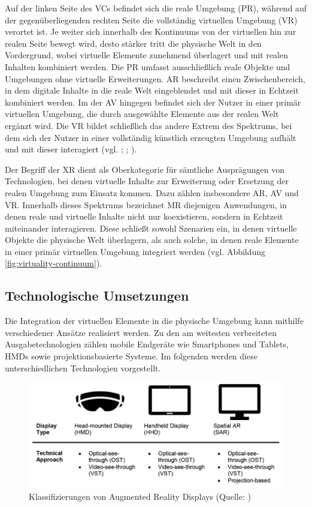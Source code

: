 Auf der linken Seite des \ac{VC}s befindet sich die reale Umgebung (\ac{PR}), während auf der gegenüberliegenden rechten Seite die vollständig virtuellen Umgebung (\ac{VR}) verortet ist. Je weiter sich innerhalb des Kontinuums von der virtuellen hin zur realen Seite bewegt wird, desto stärker tritt die physische Welt in den Vordergrund, wobei virtuelle Elemente zunehmend überlagert und mit realen Inhalten kombiniert werden. 
Die \ac{PR} umfasst ausschließlich reale Objekte und Umgebungen ohne virtuelle Erweiterungen. \ac{AR} beschreibt einen Zwischenbereich, in dem digitale Inhalte in die reale Welt eingeblendet und mit dieser in Echtzeit kombiniert werden. Im der \ac{AV} hingegen befindet sich der Nutzer in einer primär virtuellen Umgebung, die durch ausgewählte Elemente aus der realen Welt ergänzt wird. Die \ac{VR} bildet schließlich das andere Extrem des Spektrums, bei dem sich der Nutzer in einer vollständig künstlich erzeugten Umgebung aufhält und mit dieser interagiert (vgl. \citealp[S. 3]{milgram_taxonomy_1994}; \citealp[S. 8f]{knoll_augmented_2022}; \citealp[S. 3]{dilian_alejandra_zuniga_gonzalez_making_2021}).

Der Begriff der \ac{XR} dient als Oberkategorie für sämtliche Ausprägungen von Technologien, bei denen virtuelle Inhalte zur Erweiterung oder Ersetzung der realen Umgebung zum Einsatz kommen. Dazu zählen insbesondere \ac{AR}, \ac{AV} und \ac{VR}. Innerhalb dieses Spektrums bezeichnet \ac{MR} diejenigen Anwendungen, in denen reale und virtuelle Inhalte nicht nur koexistieren, sondern in Echtzeit miteinander interagieren. Diese schließt sowohl Szenarien ein, in denen virtuelle Objekte die physische Welt überlagern, als auch solche, in denen reale Elemente in einer primär virtuellen Umgebung integriert werden (vgl. Abbildung \ref{fig:virtuality-continuum}).

\subsection{Technologische Umsetzungen}
Die Integration der virtuellen Elemente in die physische Umgebung kann mithilfe verschiedener Ansätze realisiert werden. Zu den am weitesten verbreiteten Ausgabetechnologien zählen mobile Endgeräte wie Smartphones und Tablets, \ac{HMD}s sowie projektionsbasierte Systeme. Im folgenden werden diese unterschiedlichen Technologien vorgestellt.
\begin{figure}[ht]
\centering
\includegraphics[width=1\linewidth]{content/pictures/devices.PNG}
\caption{Klassifizierungen von Augmented Reality Displays (Quelle: \citealp[S. 315]{leins_comparing_2024})}
\label{fig:ar-classes}
\end{figure}

